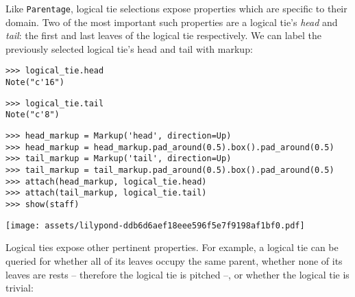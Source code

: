 \noindent Like \texttt{Parentage}, logical tie selections expose properties
which are specific to their domain. Two of the most important such properties
are a logical tie's \emph{head} and \emph{tail}: the first and last leaves of
the logical tie respectively. We can label the previously selected logical
tie's head and tail with markup:

\begin{comment}
<abjad>
logical_tie.head
logical_tie.tail
head_markup = Markup('head', direction=Up)
head_markup = head_markup.pad_around(0.5).box().pad_around(0.5)
tail_markup = Markup('tail', direction=Up)
tail_markup = tail_markup.pad_around(0.5).box().pad_around(0.5)
attach(head_markup, logical_tie.head)
attach(tail_markup, logical_tie.tail)
show(staff)
</abjad>
\end{comment}

\begin{abjadbookoutput}
\begin{singlespacing}
\vspace{-0.5\baselineskip}
\begin{verbatim}
>>> logical_tie.head
Note("c'16")
\end{verbatim}
\begin{verbatim}
>>> logical_tie.tail
Note("c'8")
\end{verbatim}
\begin{verbatim}
>>> head_markup = Markup('head', direction=Up)
>>> head_markup = head_markup.pad_around(0.5).box().pad_around(0.5)
>>> tail_markup = Markup('tail', direction=Up)
>>> tail_markup = tail_markup.pad_around(0.5).box().pad_around(0.5)
>>> attach(head_markup, logical_tie.head)
>>> attach(tail_markup, logical_tie.tail)
>>> show(staff)
\end{verbatim}
\noindent\texttt{[image: assets/lilypond-ddb6d6aef18eee596f5e7f9198af1bf0.pdf]}
\end{singlespacing}
\end{abjadbookoutput}

\noindent Logical ties expose other pertinent properties. For example, a
logical tie can be queried for whether all of its leaves occupy the same
parent, whether none of its leaves are rests -- therefore the logical tie is
pitched --, or whether the logical tie is trivial:

\begin{comment}
<abjad>
logical_tie.all_leaves_are_in_same_parent
logical_tie.is_pitched
logical_tie.is_trivial
</abjad>
\end{comment}

